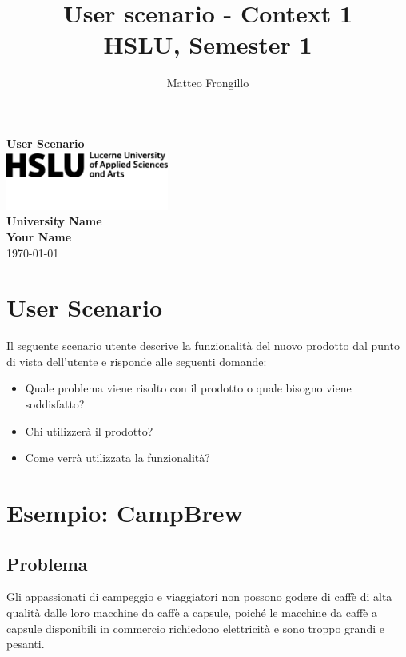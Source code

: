 \documentclass{article}
\title{\textbf{User scenario - Context 1\\ HSLU, Semester 1}}
\author{Matteo Frongillo}
\begin{document}
\begin{titlepage}
    \centering
    \vspace*{1cm}
    
    {\Huge \textbf{User Scenario}}\\[1.5cm]
    
    \includegraphics[width=0.4\textwidth]{media/hslu-svg-logo.png}\\[2cm] %
    
    \vspace{1.5cm}
    \large
    \textbf{University Name}\\[1cm]
    \textbf{Your Name}\\
    \vfill
    \today
    
\end{titlepage}

\newpage
\tableofcontents

\newpage
\section{User Scenario}
Il seguente scenario utente descrive la funzionalità del nuovo prodotto dal punto di vista dell'utente e risponde alle seguenti domande:

\begin{itemize}
    \item Quale problema viene risolto con il prodotto o quale bisogno viene soddisfatto?
    \item Chi utilizzerà il prodotto?
    \item Come verrà utilizzata la funzionalità?
\end{itemize}

\section{Esempio: CampBrew}

\subsection{Problema}
Gli appassionati di campeggio e viaggiatori non possono godere di caffè di alta qualità dalle loro macchine da caffè a capsule, poiché le macchine da caffè a capsule disponibili in commercio richiedono elettricità e sono troppo grandi e pesanti.
\end{document}
